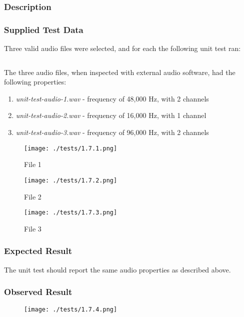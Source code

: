 \subsubsection*{Description}
\paragraph{}
{
	\centering
}

\subsubsection*{Supplied Test Data}
Three valid audio files were selected, and for each the following unit test ran: 
\inputminted[linenos]{c++}{../unit_tests/properties.cpp}

The three audio files, when inspected with external audio software, had the following properties:
\begin{enumerate}
	\item \textit{unit-test-audio-1.wav} - frequency of 48,000 Hz, with 2 channels
	\item \textit{unit-test-audio-2.wav} - frequency of 16,000 Hz, with 1 channel
	\item \textit{unit-test-audio-3.wav} - frequency of 96,000 Hz, with 2 channels
\end{enumerate}

\begin{figure}[H]
	\centering
	\texttt{[image: ./tests/1.7.1.png]}
	\caption{File 1}
\end{figure}
\begin{figure}[H]
	\centering
	\texttt{[image: ./tests/1.7.2.png]}
	\caption{File 2}
\end{figure}
\begin{figure}[H]
	\centering
	\texttt{[image: ./tests/1.7.3.png]}
	\caption{File 3}
\end{figure}

\subsubsection*{Expected Result}
The unit test should report the same audio properties as described above.

\subsubsection*{Observed Result}
\label{sec:evidence1.7}
\begin{figure}[H]
	\texttt{[image: ./tests/1.7.4.png]}
\end{figure}

